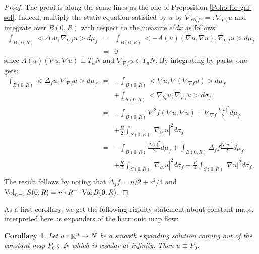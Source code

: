 \documentclass[a4paper,11pt,reqno]{amsart}
\newtheorem{coro}[defn]{Corollary}
\def\vol{\mathop{\rm vol}\nolimits}
\def\vol{\mathop{\rm Vol}\nolimits}
\def\vol{\mathop{\rm vol}\nolimits}
\def\vol{\mathop{\rm Vol}\nolimits}
\def\R{\mathop{\rm \mathbb{R}}\nolimits}
\begin{document}
\begin{proof}
The proof is along the same lines as the one of Proposition \ref{Poho-for-gal-sol}. Indeed, multiply the static equation satisfied by $u$ by $\nabla_{r\partial_r/2}=:\nabla_{\nabla f}u$ and integrate over $B(0,R)$ with respect to the measure $e^fdx$ as follows:
\begin{eqnarray*}
\int_{B(0,R)}<\Delta_fu,\nabla_{\nabla f}u>d\mu_f&=&\int_{B(0,R)}<-A(u)(\nabla u,\nabla u),\nabla_{\nabla f}u>d\mu_f\\
&=&0
\end{eqnarray*}
since $A(u)(\nabla u,\nabla u)\perp T_uN$ and $\nabla_{\nabla f}u\in T_uN$. By integrating by parts, one gets:
\begin{eqnarray*}
\int_{B(0,R)}<\Delta_fu,\nabla_{\nabla f}u>d\mu_f&=&-\int_{B(0,R)}<\nabla u,\nabla (\nabla_{\nabla f}u)>d\mu_f\\
&&+\int_{S(0,R)}<\nabla_{\partial_r}u,\nabla_{\nabla f}u>d\sigma_f\\
&=&-\int_{B(0,R)}\nabla^2f(\nabla u,\nabla u)+\nabla_{\nabla f}\frac{|\nabla u|^2}{2}d\mu_f\\
&&+\frac{R}{2}\int_{S(0,R)}|\nabla_{\partial_r}u|^2d\sigma_f\\
&=&-\int_{B(0,R)}\frac{|\nabla u|^2}{2}d\mu_f+\int_{B(0,R)}\Delta_ff\frac{|\nabla u|^2}{2}d\mu_f\\
&&+\frac{R}{2}\int_{S(0,R)}|\nabla_{\partial_r}u|^2d\sigma_f-\frac{R}{4}\int_{S(0,R)}|\nabla u|^2d\sigma_f,\\
\end{eqnarray*}
The result follows by noting that $\Delta_ff=n/2+r^2/4$ and $\vol_{n-1}S(0,R)=n\cdot R^{-1}\vol B(0,R).$











\end{proof}

As a first corollary, we get the following rigidity statement about constant maps, interpreted here as expanders of the harmonic map flow:
\begin{coro}\label{coro-unique-exp-pt}
Let $u:\R^n\rightarrow N$ be a smooth expanding solution coming out of the constant map $P_0\in N$ which is regular at infinity. Then $u\equiv P_0$. 
\end{coro}
\end{document}
